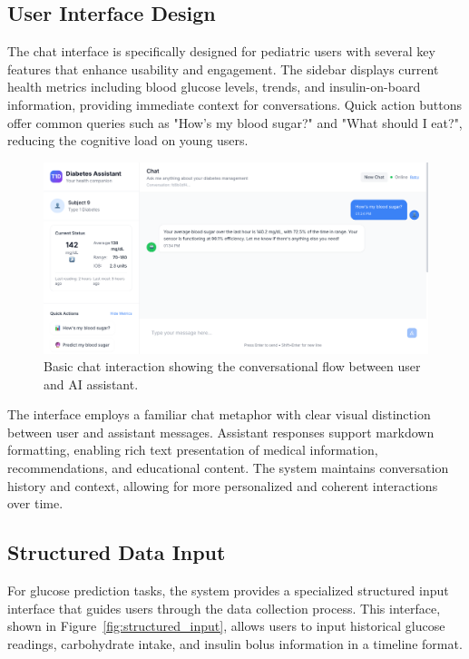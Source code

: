 \documentclass[acmsmall]{acmart}
\begin{document}
\subsection{User Interface Design}

The chat interface is specifically designed for pediatric users with several key features that enhance usability and engagement. The sidebar displays current health metrics including blood glucose levels, trends, and insulin-on-board information, providing immediate context for conversations. Quick action buttons offer common queries such as "How's my blood sugar?" and "What should I eat?", reducing the cognitive load on young users.

\begin{figure}[h]
  \centering
  \includegraphics[width=\linewidth]{images/Basic_Chat.png}
  \caption{Basic chat interaction showing the conversational flow between user and AI assistant.}
  \label{fig:basic_chat}
\end{figure}

The interface employs a familiar chat metaphor with clear visual distinction between user and assistant messages. Assistant responses support markdown formatting, enabling rich text presentation of medical information, recommendations, and educational content. The system maintains conversation history and context, allowing for more personalized and coherent interactions over time.

\subsection{Structured Data Input}

For glucose prediction tasks, the system provides a specialized structured input interface that guides users through the data collection process. This interface, shown in Figure~\ref{fig:structured_input}, allows users to input historical glucose readings, carbohydrate intake, and insulin bolus information in a timeline format.
\end{document}
